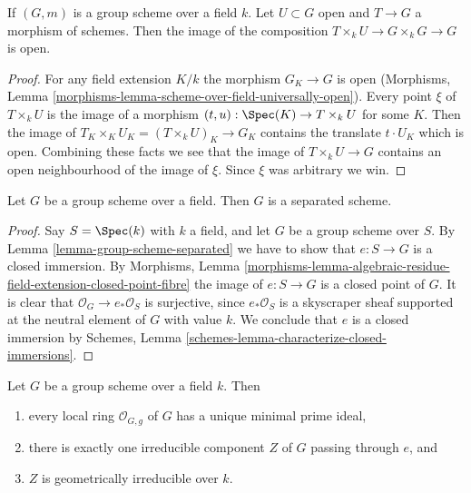 \begin{lemma}
\label{lemma-group-scheme-over-field-translate-open}
If $(G, m)$ is a group scheme over a field $k$. Let $U \subset G$
open and $T \to G$ a morphism of schemes. Then the image of the
composition $T \times_k U \to G \times_k G \to G$ is open.
\end{lemma}

\begin{proof}
For any field extension $K/k$ the morphism $G_K \to G$ is open
(Morphisms, Lemma \ref{morphisms-lemma-scheme-over-field-universally-open}).
Every point $\xi$ of $T \times_k U$ is the image of a morphism
$(t, u) : \Spec(K) \to T \times_k U$ for some $K$. Then the image of
$T_K \times_K U_K = (T \times_k U)_K \to G_K$ contains the translate
$t \cdot U_K$ which is open. Combining these facts we see that the
image of $T \times_k U \to G$ contains an open neighbourhood of
the image of $\xi$. Since $\xi$ was arbitrary we win.
\end{proof}

\begin{lemma}
\label{lemma-group-scheme-over-field-separated}
Let $G$ be a group scheme over a field.
Then $G$ is a separated scheme.
\end{lemma}

\begin{proof}
Say $S = \Spec(k)$ with $k$ a field, and let $G$ be a group scheme
over $S$. By
Lemma \ref{lemma-group-scheme-separated}
we have to show that $e : S \to G$ is a closed immersion. By
Morphisms, Lemma
\ref{morphisms-lemma-algebraic-residue-field-extension-closed-point-fibre}
the image of $e : S \to G$ is a closed point of $G$.
It is clear that $\mathcal{O}_G \to e_*\mathcal{O}_S$ is surjective,
since $e_*\mathcal{O}_S$ is a skyscraper sheaf supported at the neutral
element of $G$ with value $k$. We conclude that $e$ is a closed immersion by
Schemes, Lemma \ref{schemes-lemma-characterize-closed-immersions}.
\end{proof}

\begin{lemma}
\label{lemma-group-scheme-field-geometrically-irreducible}
Let $G$ be a group scheme over a field $k$.
Then
\begin{enumerate}
\item every local ring $\mathcal{O}_{G, g}$ of $G$ has a unique
minimal prime ideal,
\item there is exactly one irreducible component $Z$ of $G$
passing through $e$, and
\item $Z$ is geometrically irreducible over $k$.
\end{enumerate}
\end{lemma}

